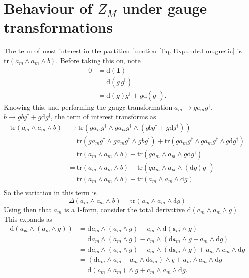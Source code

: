 \documentclass{article}
\begin{document}
\section{Behaviour of $Z_{M}$ under gauge transformations}
\label{Sec: Behaviour of Z_{M} under gauge transformations}
The term of most interest in the partition function \eqref{Eq: Expanded magnetic} is $\text{tr}\left(a_{m}\wedge a_{m}\wedge b\right)$. Before taking this on, note
\begin{align}
     0&= \mathrm{d}\left(\mathbf{1}\right)\\
     &= \mathrm{d}\left(g\,g^{\ddagger}\right)\\
    &= \mathrm{d}\left(g\right)g^{\dagger} + g\mathrm{d}\left(g^{\dagger}\right).
\end{align}
Knowing this, and performing the gauge transformation $a_{m}\rightarrow ga_{m}g^{\dagger}$, $b\rightarrow gbg^{\dagger} + g\mathrm{d}g^{\dagger}$, the term of interest transforms as
\begin{align}
    \text{tr}\left(a_{m}\wedge a_{m}\wedge b\right) &\rightarrow \text{tr}\left(g a_{m} g^{\dagger}\wedge ga_{m}g^{\dagger}\wedge\left(gbg^{\dagger}+g\mathrm{d}g^{\dagger}\right)\right)\\
    &=\text{tr}\left(ga_{m}g^{\dagger}\wedge ga_{m}g^{\dagger}\wedge gbg^{\dagger}\right) + \text{tr}\left(ga_{m}g^{\dagger}\wedge ga_{m}g^{\dagger}\wedge g\mathrm{d}g^{\dagger}\right)\\
    &= \text{tr}\left(a_{m}\wedge a_{m}\wedge b\right) +\text{tr}\left(ga_{m}\wedge a_{m}\wedge g\mathrm{d}g^{\dagger}\right)\\
    &= \text{tr}\left(a_{m}\wedge a_{m}\wedge b\right)-\text{tr}\left(ga_{m}\wedge a_{m}\wedge \left(\mathrm{d}g\right)g^{\dagger}\right)\\
    &= \text{tr}\left(a_{m}\wedge a_{m}\wedge b\right)-\text{tr}\left(a_{m}\wedge a_{m}\wedge \mathrm{d}g\right)\\
\end{align}
So the variation in this term is
\begin{equation}
    \Delta\left(a_{m}\wedge a_{m}\wedge b\right) = \text{tr}\left(a_{m}\wedge a_{m}\wedge \mathrm{d}g \right)
\end{equation}
Using then that $a_{m}$ is a 1-form, consider the total derivative $\mathrm{d}\left(a_{m}\wedge a_{m}\wedge g\right)$. This expands as
\begin{align}
    \mathrm{d}\left(a_{m}\wedge \left(a_{m}\wedge g\right)\right)&= \mathrm{d}a_{m}\wedge \left(a_{m}\wedge g\right) - a_{m}\wedge\mathrm{d}\left(a_{m}\wedge g\right)\\
    &=\mathrm{d}a_{m}\wedge \left(a_{m}\wedge g\right) - a_{m}\wedge \left(\mathrm{d}a_{m}\wedge g- a_{m}\wedge \mathrm{d}g\right)\\
    &= \mathrm{d}a_{m}\wedge \left(a_{m}\wedge g\right) - a_{m}\wedge \left(\mathrm{d}a_{m}\wedge g\right) + a_{m}\wedge a_{m}\wedge\mathrm{d}g\\
    &= \left(\mathrm{d}a_{m}\wedge a_{m}-a_{m}\wedge \mathrm{d}a_{m}\right)\wedge g + a_{m}\wedge a_{m}\wedge\mathrm{d}g\\
    &= \mathrm{d}\left(a_{m}\wedge a_{m}\right)\wedge g+ a_{m}\wedge a_{m}\wedge\mathrm{d}g.
\end{align}
\end{document}
